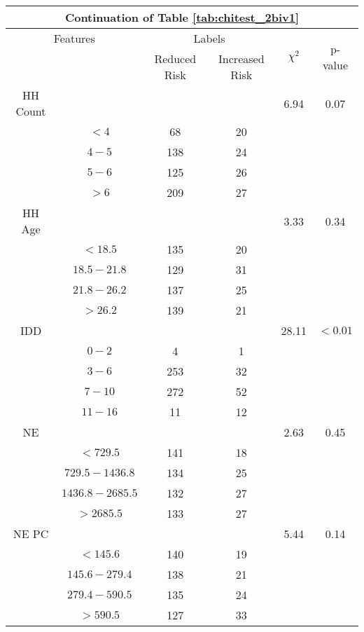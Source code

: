 \begin{table}
\centering
\label{tab:chitest_2biv1_cont}
\begin{tabular}{c c | c c| c | c}
\hline
\multicolumn{6}{c}{Continuation of Table \ref{tab:chitest_2biv1}}\\ 
\hline
\multicolumn{2}{c|}{Features}& \multicolumn{2}{c|}{Labels}& \multirow{2}{*}{$\chi^2$} & \multirow{2}{*}{p-value}\\ 
& & Reduced Risk & Increased Risk & & \\ 
\hline
HH Count &  &  & & 6.94 & 0.07 \\ 
& $< 4$ & 68 & 20& & \\ 
& $4-5$ & 138 & 24& & \\ 
& $5-6$ & 125 & 26& & \\ 
& $> 6$ & 209 & 27& & \\ 
\hline 
HH Age &  &  & & 3.33 & 0.34 \\ 
& $< 18.5$ & 135 & 20& & \\ 
& $18.5-21.8$ & 129 & 31& & \\ 
& $21.8-26.2$ & 137 & 25& & \\ 
& $> 26.2$ & 139 & 21& & \\ 
\hline 
IDD &  &  & & 28.11 & $< 0.01$ \\ 
& $0-2$ & 4 & 1& & \\ 
& $3-6$ & 253 & 32& & \\ 
& $7-10$ & 272 & 52& & \\ 
& $11-16$ & 11 & 12& & \\ 
\hline 
NE &  &  & & 2.63 & 0.45 \\ 
& $< 729.5$ & 141 & 18& & \\ 
& $729.5-1436.8$ & 134 & 25& & \\ 
& $1436.8-2685.5$ & 132 & 27& & \\ 
& $> 2685.5$ & 133 & 27& & \\ 
\hline 
NE PC &  &  & & 5.44 & 0.14 \\ 
& $< 145.6$ & 140 & 19& & \\ 
& $145.6-279.4$ & 138 & 21& & \\ 
& $279.4-590.5$ & 135 & 24& & \\ 
& $> 590.5$ & 127 & 33& & \\ 
\hline 
\end{tabular}
\end{table}

